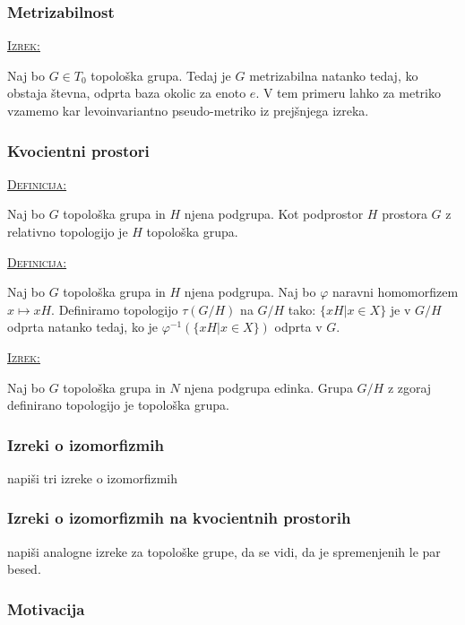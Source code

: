 \documentclass[a4paper, 12pt]{beamer}
\newenvironment{matematika}[1]{
\textcolor{bostonuniversityred}{\underline{\textsc{#1:}}}
}{
}
\begin{document}
\begin{frame}
\frametitle{Metrizabilnost}
\begin{matematika}{Izrek}
Naj bo $G \in T_0$ topološka grupa. Tedaj je $G$ metrizabilna natanko tedaj, ko obstaja števna, odprta baza okolic za enoto $e$. V tem primeru lahko za metriko vzamemo kar levoinvariantno pseudo-metriko iz prejšnjega izreka. 
\end{matematika}
\end{frame}

\begin{frame}
\frametitle{Kvocientni prostori}
\begin{matematika}{Definicija}
Naj bo $G$ topološka grupa in $H$ njena podgrupa. Kot podprostor $H$ prostora $G$ z relativno topologijo je $H$ topološka grupa.
\end{matematika}

\pause

\begin{matematika}{Definicija}
Naj bo $G$ topološka grupa in $H$ njena podgrupa. Naj bo $\varphi$ naravni homomorfizem $x \mapsto xH$. Definiramo topologijo $\tau (G/H)$ na $G/H$ tako: $\{ xH | x \in X \}$ je v $G/H$ odprta natanko tedaj, ko je $\varphi^{-1}(\{ xH | x \in X \})$ odprta v $G$.
\end{matematika} \newline

\pause

\begin{matematika}{Izrek}
Naj bo $G$ topološka grupa in $N$ njena podgrupa edinka. Grupa $G/H$ z zgoraj definirano topologijo je topološka grupa.
\end{matematika}
\end{frame}

\begin{frame}
\frametitle{Izreki o izomorfizmih}
napiši tri izreke o izomorfizmih
\end{frame}

\begin{frame}
\frametitle{Izreki o izomorfizmih na kvocientnih prostorih}
napiši analogne izreke za topološke grupe, da se vidi, da je spremenjenih le par besed.
\end{frame}

\begin{frame}
\frametitle{Motivacija}

\end{frame}
\end{document}
